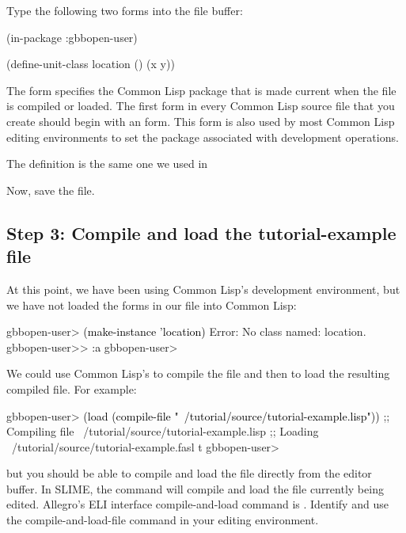 \documentclass[10pt,twoside,english,pdftex]{article}
\begin{document}
Type the following two forms into the  file
buffer:
%
\W\supp
\begin{example}
  (in-package :gbbopen-user)

  (define-unit-class location ()
    (x y))
\end{example}

The  form specifies the Common Lisp package that is
made current when the file is compiled or loaded.  The first form in every
Common Lisp source file that you create should begin with an
 form.  This form is also used by most Common Lisp
editing environments to set the package associated with development
operations.

The  definition is the same one we used in

Now, save the file.  

\subsection*{Step 3: Compile and load the tutorial-example file}

At this point, we have been using Common Lisp's
development environment, but we have not loaded the forms in our file
into Common Lisp:
%
\W\supp
\begin{example}
\textcolor{darkergray}{%
  gbbopen-user> \textcolor{black}{(make-instance 'location)}
  Error: No class named: location.
  gbbopen-user>> \textcolor{black}{:a}
  gbbopen-user>}
\end{example}

We could use Common Lisp's  to compile the file and
then  to load the resulting compiled file. For example:
%
\W\supp
\begin{example}
\textcolor{darkergray}{%
  gbbopen-user> \textcolor{black}{(load (compile-file "~/tutorial/source/tutorial-example.lisp"))}
  ;; Compiling file ~/tutorial/source/tutorial-example.lisp
  ;; Loading ~/tutorial/source/tutorial-example.fasl
  t
  gbbopen-user>}
\end{example}
%
but you should be able to compile and load the file directly from the editor
buffer.  In SLIME, the command  will compile and load the
file currently being edited.  Allegro's ELI interface compile-and-load command
is .  Identify and use the compile-and-load-file command
in your editing environment.
\end{document}
